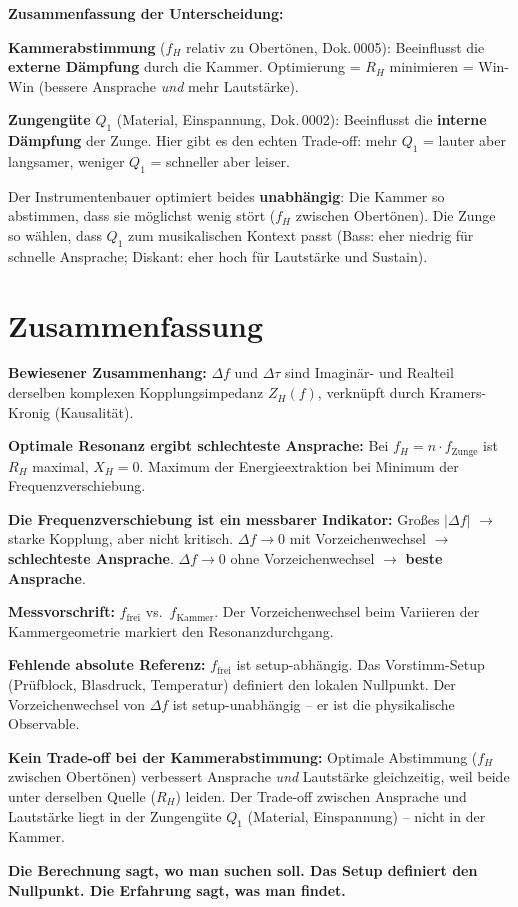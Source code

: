 \documentclass[11pt,a4paper]{article}
\begin{document}
\begin{keybox}
\textbf{Zusammenfassung der Unterscheidung:}

\textbf{Kammerabstimmung} ($f_H$ relativ zu Obertönen, Dok.\,0005): Beeinflusst die \textbf{externe Dämpfung} durch die Kammer. Optimierung = $R_H$ minimieren = Win-Win (bessere Ansprache \textit{und} mehr Lautstärke).

\textbf{Zungengüte} $Q_1$ (Material, Einspannung, Dok.\,0002): Beeinflusst die \textbf{interne Dämpfung} der Zunge. Hier gibt es den echten Trade-off: mehr $Q_1$ = lauter aber langsamer, weniger $Q_1$ = schneller aber leiser.

Der Instrumentenbauer optimiert beides \textbf{unabhängig}: Die Kammer so abstimmen, dass sie möglichst wenig stört ($f_H$ zwischen Obertönen). Die Zunge so wählen, dass $Q_1$ zum musikalischen Kontext passt (Bass: eher niedrig für schnelle Ansprache; Diskant: eher hoch für Lautstärke und Sustain).
\end{keybox}

\section{Zusammenfassung}

\begin{keybox}
\textbf{Bewiesener Zusammenhang:} $\Delta f$ und $\Delta\tau$ sind Imaginär- und Realteil derselben komplexen Kopplungsimpedanz $Z_H(f)$, verknüpft durch Kramers-Kronig (Kausalität).

\textbf{Optimale Resonanz ergibt schlechteste Ansprache:} Bei $f_H = n \cdot f_\text{Zunge}$ ist $R_H$ maximal, $X_H = 0$. Maximum der Energieextraktion bei Minimum der Frequenzverschiebung.

\textbf{Die Frequenzverschiebung ist ein messbarer Indikator:}
Großes $|\Delta f|$ $\to$ starke Kopplung, aber nicht kritisch.
$\Delta f \to 0$ mit Vorzeichenwechsel $\to$ \textbf{schlechteste Ansprache}.
$\Delta f \to 0$ ohne Vorzeichenwechsel $\to$ \textbf{beste Ansprache}.

\textbf{Messvorschrift:} $f_\text{frei}$ vs.\ $f_\text{Kammer}$. Der Vorzeichenwechsel beim Variieren der Kammergeometrie markiert den Resonanzdurchgang.

\textbf{Fehlende absolute Referenz:} $f_\text{frei}$ ist setup-abhängig. Das Vorstimm-Setup (Prüfblock, Blasdruck, Temperatur) definiert den lokalen Nullpunkt. Der Vorzeichenwechsel von $\Delta f$ ist setup-unabhängig -- er ist die physikalische Observable.

\textbf{Kein Trade-off bei der Kammerabstimmung:} Optimale Abstimmung ($f_H$ zwischen Obertönen) verbessert Ansprache \textit{und} Lautstärke gleichzeitig, weil beide unter derselben Quelle ($R_H$) leiden. Der Trade-off zwischen Ansprache und Lautstärke liegt in der Zungengüte $Q_1$ (Material, Einspannung) -- nicht in der Kammer.

\textbf{Die Berechnung sagt, wo man suchen soll. Das Setup definiert den Nullpunkt. Die Erfahrung sagt, was man findet.}
\end{keybox}
\end{document}
